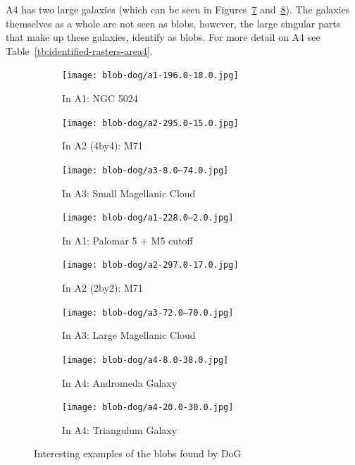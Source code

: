 A4 has two large galaxies (which can be seen in Figures~\ref{fig:andromeda} and~\ref{fig:triangulum}). The galaxies themselves as a whole are not seen as blobs, however, the large singular parts that make up these galaxies, identify as blobs. For more detail on A4 see Table~\ref{tb:identified-rasters-area4}.


\begin{figure}[H]
    \centering
    \begin{subfigure}[b]{0.32\textwidth}
        \texttt{[image: blob-dog/a1-196.0-18.0.jpg]}
        \caption{\label{fig:ngc5024-dog} In A1: NGC 5024}
    \end{subfigure}
    \begin{subfigure}[b]{0.32\textwidth}
        \texttt{[image: blob-dog/a2-295.0-15.0.jpg]}
        \caption{\label{fig:M71-dog-4b4}In A2 (4by4): M71}
    \end{subfigure}
    \begin{subfigure}[b]{0.32\textwidth}
        \texttt{[image: blob-dog/a3-8.0--74.0.jpg]}
        \caption{\label{fig:small-magellanic-cloud}In A3: Small Magellanic Cloud}
    \end{subfigure}
    \begin{subfigure}[b]{0.32\textwidth}
        \texttt{[image: blob-dog/a1-228.0--2.0.jpg]}
        \caption{\label{fig:palomar5-and-M5} In A1: Palomar 5 + M5 cutoff}
    \end{subfigure}
    \begin{subfigure}[b]{0.32\textwidth}
        \texttt{[image: blob-dog/a2-297.0-17.0.jpg]}
        \caption{\label{fig:M71-dog-2b2}In A2 (2by2): M71}
    \end{subfigure}
    \begin{subfigure}[b]{0.32\textwidth}
        \texttt{[image: blob-dog/a3-72.0--70.0.jpg]}
        \caption{\label{fig:large-magellanic-cloud}In A3: Large Magellanic Cloud}
    \end{subfigure}
    \begin{subfigure}[b]{0.32\textwidth}
        \texttt{[image: blob-dog/a4-8.0-38.0.jpg]}
        \caption{\label{fig:andromeda}In A4: Andromeda Galaxy}
    \end{subfigure}
    \begin{subfigure}[b]{0.32\textwidth}
        \texttt{[image: blob-dog/a4-20.0-30.0.jpg]}
        \caption{\label{fig:triangulum}In A4: Triangulum Galaxy}
    \end{subfigure}

    \caption{\label{fig:dog-examples} Interesting examples of the blobs found by DoG}
\end{figure}



